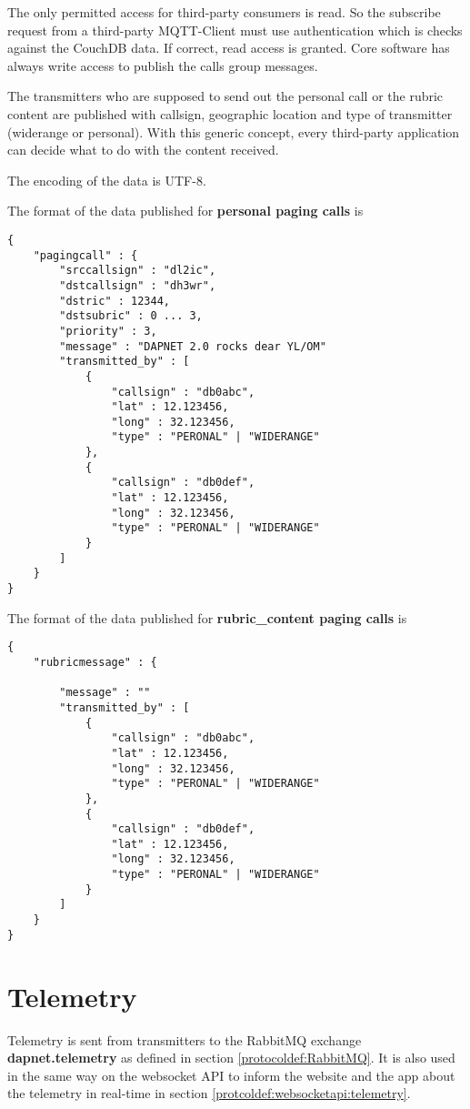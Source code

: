 The only permitted access for third-party consumers is read. So the subscribe request from a third-party MQTT-Client must use authentication which is checks against the CouchDB data. If correct, read access is granted. Core software has always write access to publish the calls group messages.

The transmitters who are supposed to send out the personal call or the rubric content are published with callsign, geographic location and type of transmitter (widerange or personal). With this generic concept, every third-party application can decide what to do with the content received.

The encoding of the data is UTF-8.

The format of the data published for \textbf{personal paging calls} is
\begin{lstlisting}
{
	"pagingcall" : {
		"srccallsign" : "dl2ic",		
		"dstcallsign" : "dh3wr",
		"dstric" : 12344,
		"dstsubric" : 0 ... 3,
		"priority" : 3,
		"message" : "DAPNET 2.0 rocks dear YL/OM"
		"transmitted_by" : [
			{
				"callsign" : "db0abc",
				"lat" : 12.123456,
				"long" : 32.123456,
				"type" : "PERONAL" | "WIDERANGE"
			},
			{
				"callsign" : "db0def",
				"lat" : 12.123456,
				"long" : 32.123456,
				"type" : "PERONAL" | "WIDERANGE"
			}
		]
	}
}
\end{lstlisting}

The format of the data published for \textbf{rubric\_content paging calls} is
\begin{lstlisting}
{
	"rubricmessage" : {
		
		"message" : ""
		"transmitted_by" : [
			{
				"callsign" : "db0abc",
				"lat" : 12.123456,
				"long" : 32.123456,
				"type" : "PERONAL" | "WIDERANGE"
			},
			{
				"callsign" : "db0def",
				"lat" : 12.123456,
				"long" : 32.123456,
				"type" : "PERONAL" | "WIDERANGE"
			}
		]
	}
}
\end{lstlisting}

\section{Telemetry}
\label{protocoldef:telemetry}
Telemetry is sent from transmitters to the RabbitMQ exchange \textbf{dapnet.telemetry} as defined in section \ref{protocoldef:RabbitMQ}. It is also used in the same way on the websocket API to inform the website and the app about the telemetry in real-time in section \ref{protcoldef:websocketapi:telemetry}.

